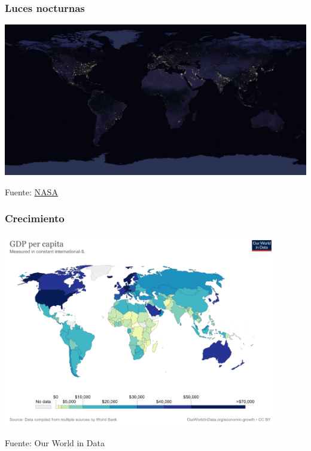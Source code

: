 \documentclass{beamer}
\begin{document}
\begin{frame}
\frametitle{Luces nocturnas}
\begin{center}
    \includegraphics[scale=0.06]{../Tema_11.11_crecimiento2.jpg}
\end{center}
Fuente: \href{https://www.nasa.gov/feature/goddard/2017/new-night-lights-maps-open-up-possible-real-time-applications}{NASA}
\end{frame}

\begin{frame}
\frametitle{Crecimiento}
\begin{center}
    \href{https://ourworldindata.org/grapher/gdp-per-capita-worldbank} {\includegraphics[width=0.9\textwidth]{../Figures/gdppc2020.png}}
\end{center}
Fuente: Our World in Data
\end{frame}
\end{document}
